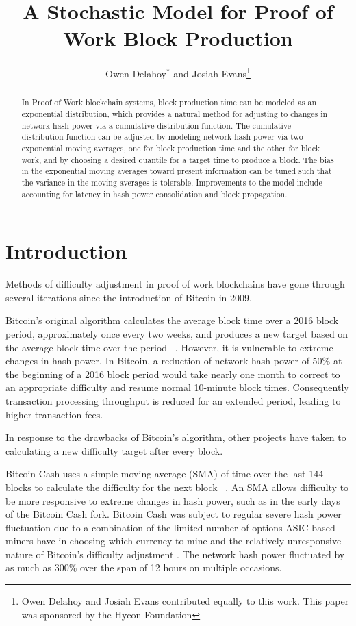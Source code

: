 \documentclass[]{article}
\title{A Stochastic Model for Proof of Work Block Production}
\author{Owen Delahoy$^*$ and Josiah Evans\footnote{Owen Delahoy and Josiah Evans contributed equally to this work. This paper was sponsored by the Hycon Foundation}}
\begin{document}
\maketitle


\begin{abstract}
In Proof of Work blockchain systems, block production time can be modeled as an exponential distribution, which provides a natural method for adjusting to changes in network hash power via a cumulative distribution function.  The cumulative distribution function can be adjusted by modeling network hash power via two exponential moving averages, one for block production time and the other for block work, and by choosing a desired quantile for a target time to produce a block.  The bias in the exponential moving averages toward present information can be tuned such that the variance in the moving averages is tolerable.  Improvements to the model include accounting for latency in hash power consolidation and block propagation.     
\end{abstract}

\section{Introduction}
Methods of difficulty adjustment in proof of work blockchains have gone through several iterations since the introduction of Bitcoin in 2009.  
\newline

Bitcoin's original algorithm calculates the average block time over a 2016 block period, approximately once every two weeks, and produces a new target based on the average block time over the period ~\cite{BitcoinRetarget}.  However, it is vulnerable to extreme changes in hash power.  In Bitcoin, a reduction of network hash power of 50\% at the beginning of a 2016 block period would take nearly one month to correct to an appropriate difficulty and resume normal 10-minute block times.  Consequently transaction processing throughput is reduced for an extended period, leading to higher transaction fees.   
\newline

In response to the drawbacks of Bitcoin's algorithm, other projects have taken to calculating a new difficulty target after every block.   
\newline

Bitcoin Cash uses a simple moving average (SMA) of time over the last 144 blocks to calculate the difficulty for the next block ~\cite{Bitcoin-ABC}.  An SMA allows difficulty to be more responsive to extreme changes in hash power, such as in the early days of the Bitcoin Cash fork.  Bitcoin Cash was subject to regular severe hash power fluctuation due to a combination of the limited number of options ASIC-based miners have in choosing which currency to mine and the relatively unresponsive nature of Bitcoin's difficulty adjustment \cite{BitcoinCashMining}.  The network hash power fluctuated by as much as 300\% \cite{BitcoinCashDifficulty} over the span of 12 hours on multiple occasions.   
\newline
\end{document}
